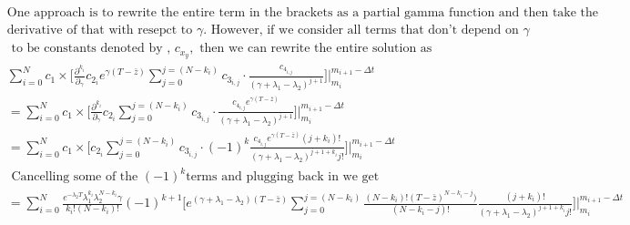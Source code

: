 \documentclass{article}
\begin{document}
\begin{align}
& \text{One approach is to rewrite the entire term in the brackets as a partial gamma function and then take the } \nonumber \\
& \text{derivative of that with resepct to } \gamma.  \text{ However, if we consider all terms that don't depend on } \gamma \nonumber \\
& \text{ to be constants denoted by , } c_{x_y}, \text{ then we can rewrite the entire solution as} \nonumber \\
& \sum_{i=0}^N c_1 \times
                 \Big[\frac{\partial^{k_i}}{\partial_{\gamma}}
                 c_{2_i}e^{\gamma (T - \bar{z})}\sum_{j=0}^{j=(N-k_i)}c_{3_{i,j}}\cdot 
                 \frac{c_{4_{i,j}}}{(\gamma + \lambda_1 - \lambda_2)^{j+1}}\Big]
                 \Big|_{m_i}^{m_{i+1}-\Delta t} \nonumber \\
& = \sum_{i=0}^N c_1 \times
                 \Big[\frac{\partial^{k_i}}{\partial_{\gamma}}
                 c_{2_i}\sum_{j=0}^{j=(N-k_i)}c_{3_{i,j}}\cdot 
                 \frac{c_{4_{i,j}}e^{\gamma (T - \bar{z})}}{(\gamma + \lambda_1 - \lambda_2)^{j+1}}\Big]
                 \Big|_{m_i}^{m_{i+1}-\Delta t} \nonumber\\
& = \sum_{i=0}^N c_1 \times
                 \Big[c_{2_i}\sum_{j=0}^{j=(N-k_i)}c_{3_{i,j}}\cdot 
                 (-1)^k\frac{c_{4_{i,j}}e^{\gamma (T - \bar{z})}(j+k_i)!}{(\gamma + \lambda_1 - \lambda_2)^{j+1+k_i}j!}\Big]
                 \Big|_{m_i}^{m_{i+1}-\Delta t} \nonumber \\
&\text { Cancelling some of the } (-1)^k \text{terms and plugging back in we get} \nonumber \\
& =  \sum_{i=0}^N \frac{e^{-\lambda_2 T}\lambda_1^{k_i}\lambda_2^{N-k_i} \gamma}{k_i!(N-k_i)!}(-1)^{k+1}
                  \Big[e^{(\gamma + \lambda_1 - \lambda_2) (T - \bar{z})}
                  \sum_{j=0}^{j=(N-k_i)} \frac{(N-k_i) ! (T-\bar{z})^{N-k_i-j})}{(N-k_i - j)!}
                  \frac{(j+k_i)!}{(\gamma + \lambda_1 - \lambda_2)^{j+1+k_i}j!}\Big]
                 \Big|_{m_i}^{m_{i+1}-\Delta t} \nonumber \\

\end{align}
\end{document}
